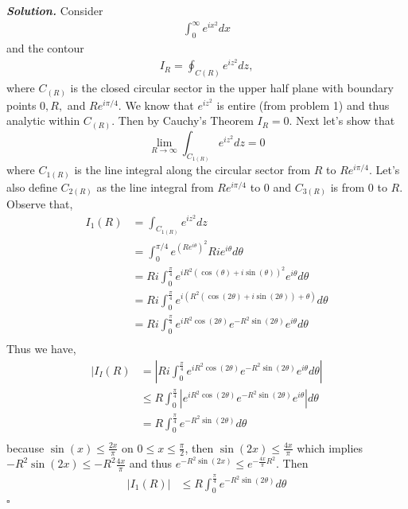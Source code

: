 \documentclass[12pt]{report}
\newenvironment{solution}[1][\it{Solution}]{\textbf{#1. } }{$\square$}
\begin{document}
\begin{solution}
    \noindent
    Consider 
    \begin{align*}
        \int_0^\infty e^{ix^2}dx
    \end{align*}
    and the contour
    \begin{align*}
        I_R = \oint_{C(R)}e^{iz^2}dz,
    \end{align*}
    where $C_{(R)}$ is the closed circular sector in the upper half plane with boundary points $0,R,$ and $Re^{i\pi/4}$. We know that $e^{iz^2}$ is entire (from problem 1) and thus analytic within $C_{(R)}$. Then by Cauchy's Theorem $I_{R} = 0$. Next let's show that $$\lim_{R \rightarrow \infty} \int_{C_{1(R)}} e^{iz^2} dz = 0$$
    where $C_{1(R)}$ is the line integral along the circular sector from $R$ to $Re^{i\pi/4}$. Let's also define $C_{2(R)}$ as the line integral from $Re^{i\pi/4}$ to $0$ and $C_{3(R)}$ is from $0$ to $R$. Observe that,
    \begin{align*}
        I_{1}(R)&=\int_{C_{1(R)}} e^{iz^2} dz\\ 
        &= \int_{0}^{\pi/4} e^{\left(Re^{i\theta}\right)^2}R i e^{i\theta}d\theta\\
        &= Ri \int_0^{\frac{\pi}{4}}e^{iR^2\left( \cos(\theta) + i\sin(\theta)\right)^2}e^{i\theta}d\theta\\
        &= Ri \int_0^{\frac{\pi}{4}}e^{i\left(R^2\left( \cos(2\theta) + i\sin(2\theta)\right) + \theta \right)}d\theta\\
        &= Ri \int_0^{\frac{\pi}{4}} e^{iR^2\cos(2\theta)} e^{-R^2\sin(2\theta)}e^{i\theta}d\theta\\
    \end{align*}
    Thus we have,
    \begin{align*}
        |I_{I}(R) &= \left|Ri \int_0^{\frac{\pi}{4}} e^{iR^2\cos(2\theta)} e^{-R^2\sin(2\theta)}e^{i\theta}d\theta \right|\\
        &\leq R \int_0^{\frac{\pi}{4}} \left|e^{iR^2\cos(2\theta)} e^{-R^2\sin(2\theta)}e^{i\theta} \right|d\theta\\
        &= R \int_0^{\frac{\pi}{4}} e^{-R^2\sin(2\theta)} d\theta\\
    \end{align*}
    because $\sin(x) \leq \frac{2x}{\pi}$ on $0 \leq x \leq \frac{\pi}{2}$, then $\sin(2x) \leq \frac{4x}{\pi}$ which implies $-R^2\sin(2x) \leq -R^2\frac{4x}{\pi}$ and thus $e^{-R^2\sin(2x)} \leq e^{-\frac{4x}{\pi}R^2}$. Then
    \begin{align*}
        |I_{1}(R)| &\leq R \int_0^{\frac{\pi}{4}} e^{-R^2\sin(2\theta)} d\theta\\

\end{align*}
\end{solution}
\end{document}
